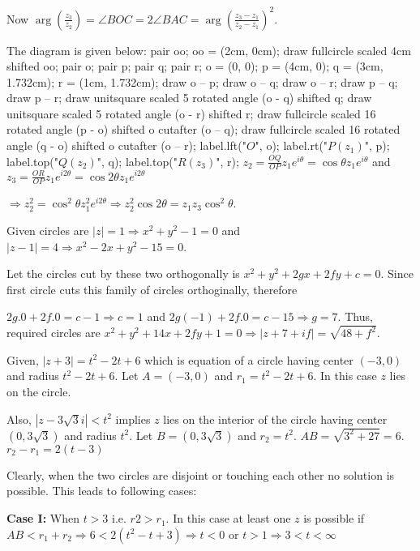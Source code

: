   Now $\arg\left(\frac{z_3}{z_2}\right) = \angle BOC = 2\angle BAC = \arg\left(\frac{z_3 - z_1}{z_2 -
    z_1}\right)^2$.
  \vskip 2cm
\item The diagram is given below:
  \startplacefigure[location={left, none}]
    \startMPcode
      pair oo;
      oo = (2cm, 0cm);
      draw fullcircle scaled 4cm shifted oo;
      pair o; pair p; pair q; pair r;
      o = (0, 0); p = (4cm, 0); q = (3cm, 1.732cm); r = (1cm, 1.732cm);
      draw o -- p; draw o -- q; draw o -- r; draw p -- q; draw p -- r;
      draw unitsquare scaled 5 rotated angle (o - q) shifted q;
      draw unitsquare scaled 5 rotated angle (o - r) shifted r;
      draw fullcircle scaled 16 rotated angle (p - o) shifted o cutafter (o -- q);
      draw fullcircle scaled 16 rotated angle (q - o) shifted o cutafter (o -- r);
      label.lft("$O$", o);
      label.rt("$P(z_1)$", p);
      label.top("$Q(z_2)$", q);
      label.top("$R(z_3)$", r);
    \stopMPcode
  \stopplacefigure
  $z_2 = \frac{OQ}{OP}z_1e^{i\theta} = \cos\theta z_1e^{i\theta}$ and $z_3 = \frac{OR}{OP}z_1e^{i2\theta} =
  \cos2\theta z_1e^{i2\theta}$

  $\Rightarrow z_2^2 = \cos^2\theta z_1^2e^{i2\theta} \Rightarrow z_2^2\cos2\theta = z_1z_3\cos^2\theta$.
  \vskip 2.5cm
\item Given circles are $|z| = 1 \Rightarrow x^2 + y^2 - 1 = 0$ and $|z - 1| = 4 \Rightarrow x^2 - 2x + y^2
  - 15 = 0$.

  Let the circles cut by these two orthogonally is $x^2 + y^2 + 2gx + 2fy + c = 0$. Since first circle cuts
  this family of circles orthoginally, therefore

  $2g.0 + 2f.0 = c - 1 \Rightarrow c = 1$ and $2g(-1) + 2f.0 = c - 15 \Rightarrow g = 7$.
  Thus, required circles are $x^2 + y^2 + 14x + 2fy + 1 = 0 \Rightarrow |z + 7 + if| = \sqrt{48 + f^2}$.
\item Given, $|z + 3| = t^2 - 2t + 6$ which is equation of a circle having center $(-3, 0)$ and radius $t^2 - 2t +
  6$. Let $A = (-3, 0)$ and $r_1 = t^2 - 2t + 6$. In this case $z$ lies on the circle.

  Also, $|z - 3\sqrt{3}i| < t^2$ implies $z$ lies on the interior of the circle having center $(0,
  3\sqrt{3})$ and radius $t^2$. Let $B = (0, 3\sqrt{3})$ and $r_2 = t^2$. $AB = \sqrt{3^2 + 27} = 6$. $r_2 -
  r_1 = 2(t - 3)$

  Clearly, when the two circles are disjoint or touching each other no solution is possible. This leads to
  following cases:

  {\bf Case I:} When $t > 3$ i.e. $r2 > r_1$. In this case at least one $z$ is possible if $AB < r_1 + r_2
  \Rightarrow 6 < 2(t^2 - t + 3)\Rightarrow t < 0$ or $t > 1\Rightarrow 3 < t <\infty$

